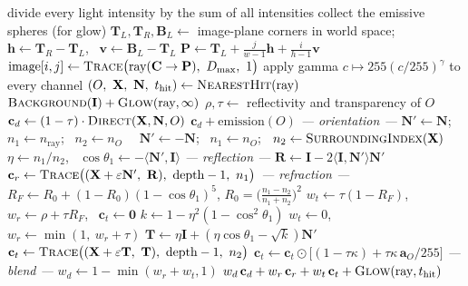 \documentclass[11pt,a4paper]{article}
\newcommand{\vv}[1]{\mathbf{#1}}
\newcommand{\dotp}[2]{\langle #1, #2\rangle}
\begin{document}
\begin{algorithm}[p]
\caption{The complete freestyle ray tracer: rendering and tracing}
\label{alg:full}
\begin{algorithmic}[1]
  \State divide every light intensity by the sum of all intensities
  \State collect the emissive spheres (for glow)
  \State $\vv T_L,\vv T_R,\vv B_L\gets$ image-plane corners in world space; \ $\vv h\gets\vv T_R-\vv T_L$, \ $\vv v\gets\vv B_L-\vv T_L$
     \State $\vv P\gets \vv T_L + \tfrac{j}{w-1}\vv h + \tfrac{i}{h-1}\vv v$
     \State $\text{image}[i,j]\gets\textsc{Trace}\big(\text{ray}(\vv C\to\vv P),\ D_{\max},\ 1\big)$
  \EndFor
  \State apply gamma $c\mapsto 255(c/255)^\gamma$ to every channel
\EndFunction
\Statex
\Function{Trace}{ray $(\vv o,\vv I)$, depth, $n_{\text{ray}}$}
  \State $(O,\ \vv X,\ \vv N,\ t_{\text{hit}})\gets\textsc{NearestHit}(\text{ray})$ 
     \State \Return $\textsc{Background}(\vv I) + \textsc{Glow}(\text{ray}, \infty)$
  \EndIf
  \State $\rho,\tau\gets$ reflectivity and transparency of $O$
  \State $\vv c_d\gets(1-\tau)\cdot\textsc{Direct}(\vv X,\vv N,O)$ 
     \State \Return $\vv c_d + \text{emission}(O)$ 
  \EndIf
  \Statex \hspace{\algorithmicindent}\textit{--- orientation ---}
  \If{$\dotp{\vv N}{\vv I}<0$} $\vv N'\gets\vv N$; \ $n_1\gets n_{\text{ray}}$; \ $n_2\gets n_O$ 
  \Else\ \ $\vv N'\gets-\vv N$; \ $n_1\gets n_O$; \ $n_2\gets\textsc{SurroundingIndex}(\vv X)$ 
  \EndIf
  \State $\eta\gets n_1/n_2$, \ $\cos\theta_1\gets-\dotp{\vv N'}{\vv I}$
  \Statex \hspace{\algorithmicindent}\textit{--- reflection ---}
  \State $\vv R\gets\vv I-2\dotp{\vv I}{\vv N'}\vv N'$
  \State $\vv c_r\gets\textsc{Trace}\big((\vv X+\varepsilon\vv N',\ \vv R),\ \text{depth}-1,\ n_1\big)$
  \Statex \hspace{\algorithmicindent}\textit{--- refraction ---}
  \State $R_F\gets R_0+(1-R_0)(1-\cos\theta_1)^5$, \quad $R_0=\big(\frac{n_1-n_2}{n_1+n_2}\big)^2$
  \State $w_t\gets\tau(1-R_F)$, \ $w_r\gets\rho+\tau R_F$, \ $\vv c_t\gets\vv 0$
     \State $k\gets1-\eta^2(1-\cos^2\theta_1)$
      
        \State $w_t\gets0$, \ $w_r\gets\min(1,\ w_r+\tau)$
     \Else
        \State $\vv T\gets\eta\vv I+(\eta\cos\theta_1-\sqrt k)\vv N'$
        \State $\vv c_t\gets\textsc{Trace}\big((\vv X+\varepsilon\vv T,\ \vv T),\ \text{depth}-1,\ n_2\big)$
        \State $\vv c_t\gets \vv c_t\odot\big[(1-\tau\kappa)+\tau\kappa\,\vv a_O/255\big]$ 
     \EndIf
  \EndIf
  \Statex \hspace{\algorithmicindent}\textit{--- blend ---}
  \State $w_d\gets1-\min(w_r+w_t,1)$
  \State \Return $w_d\,\vv c_d + w_r\,\vv c_r + w_t\,\vv c_t + \textsc{Glow}(\text{ray}, t_{\text{hit}})$
\EndFunction
\end{algorithmic}
\end{algorithm}
\end{document}
